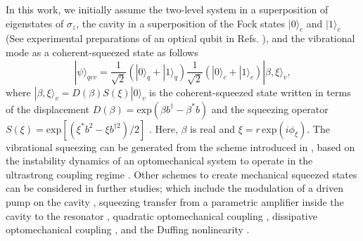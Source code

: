 In this work, we initially assume the two-level system in a superposition of eigenstates of $\sigma_z$, the cavity in a superposition of the Fock states $|0\rangle_{c}$ and $|1\rangle_{c}$ (See experimental preparations of an optical qubit in Refs. \cite{vogel1993quantum, parkins1993synthesis, law1997deterministic}), and the vibrational mode as a coherent-squeezed state \cite{caves1980quantum, caves1981quantum} as follows
\begin{equation}\label{initial_state_qcv}
|\psi\rangle_{qcv}=\frac{1}{\sqrt{2}}\left(|0\rangle_{q}+|1\rangle_{q}\right)\frac{1}{\sqrt{2}}\left(|0\rangle_{c}+|1\rangle_{c}\right) |\beta, \xi\rangle_{v},
\end{equation}
where $|\beta, \xi\rangle_{v}=D(\beta)S(\xi)|0\rangle_{v}$ is the coherent-squeezed state written in terms of the displacement $D(\beta)=\textrm{exp}\left(\beta b^{\dagger}-\beta^{*}b\right)$ and the squeezing operator $S(\xi)=\textrm{exp}\left[\left(\xi^{*}b^{2}-\xi b^{\dagger 2}\right)/2\right]$ \cite{glauber1963coherent, gerry2005introductory}. Here, $\beta$ is real and $\xi=r\,\textrm{exp}(i\phi_{\xi})$. The vibrational squeezing can be generated from the scheme introduced in \cite{kustura2022mechanical}, based on the instability dynamics of an optomechanical system to operate in the ultrastrong coupling regime \cite{das2023instabilities, PhysRevX.11.021009}. Other schemes to create mechanical squeezed states can be considered in further studies; which include the modulation of a driven pump on the cavity \cite{bennett2018rapid, xiong2020strong, bai2020strong, li2023mechanical}, squeezing transfer from a parametric amplifier inside the cavity to the resonator \cite{agarwal2016strong}, quadratic optomechanical coupling \cite{asjad2014robust}, dissipative optomechanical coupling \cite{gu2013generation}, and the Duffing nonlinearity \cite{lu2015steady, bai2019engineering}.  




